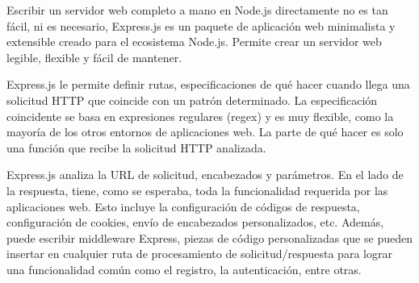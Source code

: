 Escribir un servidor web completo a mano en Node.js directamente no es tan fácil, ni es necesario, Express.js es un paquete de aplicación web minimalista y extensible creado para el ecosistema Node.js. Permite crear un servidor web legible, flexible y fácil de mantener.
\vspace{0.8cm}

Express.js le permite definir rutas, especificaciones de qué hacer cuando llega una solicitud HTTP que coincide con un patrón determinado. La especificación coincidente se basa en expresiones regulares (regex) y es muy flexible, como la mayoría de los otros entornos de aplicaciones web. La parte de qué hacer es solo una función que recibe la solicitud HTTP analizada.
\vspace{0.8cm}

Express.js analiza la URL de solicitud, encabezados y parámetros. En el lado de la respuesta, tiene, como se esperaba, toda la funcionalidad requerida por las aplicaciones web. Esto incluye la configuración de códigos de respuesta, configuración de \glspl{cookie}, envío de encabezados personalizados, etc. Además, puede escribir middleware Express, piezas de código personalizadas que se pueden insertar en cualquier ruta de procesamiento de solicitud/respuesta para lograr una funcionalidad común como el registro, la autenticación, entre otras.
\vspace{0.8cm}


